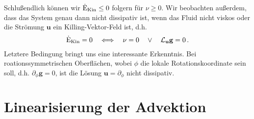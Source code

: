 \documentclass[a4paper,11pt]{scrartcl}
\newcommand{\U}{u} %
\newcommand{\Ub}{\mathbf{\U}} %
\newcommand{\g}{\mathbf{g}} %
\newcommand{\dtekin}{\dot{\textup{E}}_{\textup{Kin}}} %
\newcommand{\lie}{\mathcal{L}} %
\newcommand{\formPeriod}{\,\text{.}}
\begin{document}
  Schlußendlich können wir \( \dtekin \le 0 \) folgern für \( \nu \ge 0 \).
  Wir beobachten außerdem, dass das System genau dann nicht dissipativ ist,
  wenn das Fluid nicht viskos oder die Strömung \(\Ub  \) ein Killing-Vektor-Feld ist,
  d.h.
  \begin{align}
    \dtekin = 0 \quad\Longleftrightarrow\quad \nu = 0 \quad \vee \quad \lie_{\Ub}\g = 0 \formPeriod
  \end{align}
  Letztere Bedingung bringt uns eine interessante Erkenntnis. 
  Bei roationssymmetrischen Oberflächen, wobei \( \phi \) die lokale Rotationskoordinate sein soll,
  d.h. \( \partial_{\phi}\g = 0 \), ist die Lösung \( \Ub = \partial_{\phi} \) nicht dissipativ.
  
\section{Linearisierung der Advektion}
\end{document}

